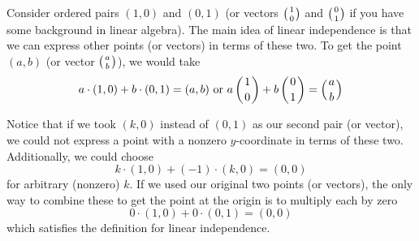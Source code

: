 \documentclass[11pt]{article}
\begin{document}
\pagestyle{fancy}

%

Consider ordered pairs \((1, 0)\) and \((0, 1)\) (or vectors \(\left({1}\atop{0}\right)\) and \(\left({0}\atop{1}\right)\) if you have some background in linear algebra).  The main idea of linear independence is that we can express other points (or vectors) in terms of these two. To get the point  \((a, b)\) (or vector \(\left({a}\atop{b}\right)\)), we would take \[a\cdot(1, 0) + b\cdot(0, 1) =  (a, b)\text{ or }  a\left({1}\atop{0}\right) + b\left({0}\atop{1}\right) = \left({a\atop b}\right)\]

Notice that if we took \((k, 0)\) instead of \((0, 1)\) as our second pair (or vector), we could not express a point with a nonzero \(y\)-coordinate in terms of these two.  Additionally, we could choose \[k\cdot(1, 0) + (-1)\cdot(k, 0) =  (0, 0)\] for arbitrary (nonzero) \(k\).  If we used our original two points (or vectors), the only way to combine these to get the point at the origin is to multiply each by zero \[0\cdot(1, 0) + 0\cdot(0, 1) =  (0, 0)\] which satisfies the definition for linear independence.
\end{document}
